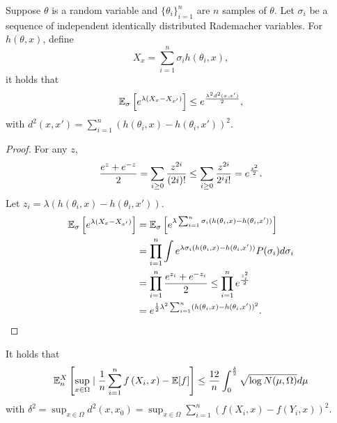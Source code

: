 


\begin{lemma}\label{lm:rademacher}
Suppose $\theta$ is a random variable and $\{\theta_i\}_{i=1}^n$ are $n$ samples of $\theta$. Let $\sigma_{i}$ be a sequence of independent identically distributed Rademacher variables. For $h(\theta, x)$, define
$$
X_x = \sum_{i=1}^n \sigma_ih(\theta_i, x),
$$
it holds that
$$
\mathbb{E}_\sigma\left[ e^{\lambda (X_x - X_{x'})}\right]\le e^{\lambda^2 d^2(x, x')\over 2},
$$
with $\displaystyle d^2(x, x') = \sum_{i=1}^n(h(\theta_i, x) - h(\theta_i, x'))^2$.
\end{lemma}
\begin{proof}
For any $z$,
$$
{e^{z} + e^{-z}\over 2}=\sum_{i\ge 0} {z^{2i}\over (2i)!} \le \sum_{i\ge 0} {z^{2i}\over 2^i i!} = e^{z^2\over 2}.
$$
Let $z_i= \lambda  (h(\theta_i, x) - h(\theta_i, x'))$.
\begin{align}  
\displaystyle 
\mathbb{E}_\sigma\left[ e^{\lambda (X_x - X_{x'})}\right]&=\mathbb{E}_\sigma\left[ e^{\lambda \sum_{i=1}^n \sigma_i(h(\theta_i, x) - h(\theta_i, x'))}\right]
\\
&=\prod_{i=1}^n \int e^{\lambda \sigma_i(h(\theta_i, x) - h(\theta_i, x'))} P(\sigma_i) d\sigma_i
\\
&=\prod_{i=1}^n  {e^{z_i} + e^{-z_i}\over 2}  \le \prod_{i=1}^n  e^{z_i^2\over 2}  
\\ 
&= e^{{1\over 2}\lambda^2  \sum_{i=1}^n(h(\theta_i, x) - h(\theta_i, x'))^2}.
\end{align}
\end{proof}
\newpage
\begin{remark}\label{remark:supest}
It holds that
\begin{align}
\mathbb{E}_n^{X}\left[\sup _{x \in \Omega} \mid \frac{1}{n} \sum_{i=1}^{n} f\left(X_{i}, x\right)-\mathbb{E}[f]\right]  \leq {12\over n}\int_0^{\delta\over 2} \sqrt{\log N(\mu, \Omega)} d \mu
\end{align}
with $\displaystyle \delta^2=\sup_{x\in \Omega} d^2(x, x_0) = \sup_{x\in \Omega}\sum_{i=1}^n(f(X_i, x) - f(Y_i, x))^2$.
 \end{remark}
